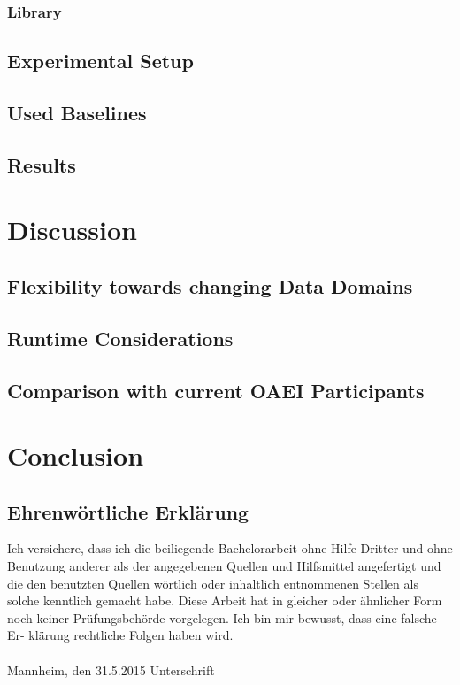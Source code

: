 \documentclass[11pt,titlepage,oneside,openany,a4paper]{report}
\begin{document}
\subsection{Library}
\section{Experimental Setup}
\section{Used Baselines}
\section{Results}



\chapter{Discussion}
\section{Flexibility towards changing Data Domains}
\section{Runtime Considerations}
\section{Comparison with current OAEI Participants}


\chapter{Conclusion}


\clearpage
\newpage







\newpage

\pagestyle{empty}


\section*{Ehrenw\"ortliche Erkl\"arung}
Ich versichere, dass ich die beiliegende Bachelorarbeit ohne Hilfe Dritter
und ohne Benutzung anderer als der angegebenen Quellen und Hilfsmittel
angefertigt und die den benutzten Quellen w\"ortlich oder inhaltlich
entnommenen Stellen als solche kenntlich gemacht habe. Diese Arbeit
hat in gleicher oder \"ahnlicher Form noch keiner Pr\"ufungsbeh\"orde
vorgelegen. Ich bin mir bewusst, dass eine falsche Er- kl\"arung rechtliche Folgen haben
wird.
\\
\\

\noindent
Mannheim, den 31.5.2015 \hspace{4cm} Unterschrift
\end{document}
